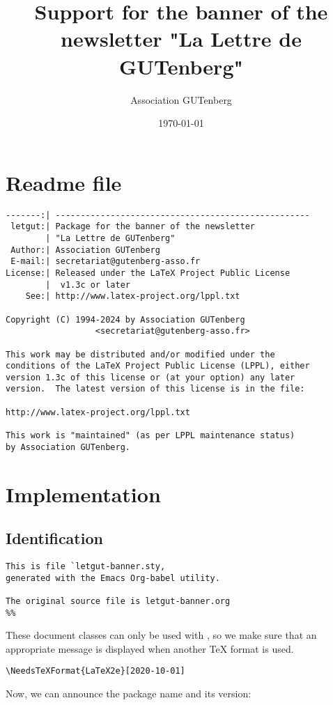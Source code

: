 \documentclass{letgut}
\author{Association GUTenberg}
\date{\today}
\title{Support for the banner of the newsletter "La Lettre de GUTenberg"}
\begin{document}
\section{Readme file}
\label{Readmefile-dlkgxqt0fck0}
\begin{lstlisting}
-------:| ---------------------------------------------------
 letgut:| Package for the banner of the newsletter
        | "La Lettre de GUTenberg"
 Author:| Association GUTenberg
 E-mail:| secretariat@gutenberg-asso.fr
License:| Released under the LaTeX Project Public License
        |  v1.3c or later
    See:| http://www.latex-project.org/lppl.txt

Copyright (C) 1994-2024 by Association GUTenberg
                  <secretariat@gutenberg-asso.fr>

This work may be distributed and/or modified under the
conditions of the LaTeX Project Public License (LPPL), either
version 1.3c of this license or (at your option) any later
version.  The latest version of this license is in the file:

http://www.latex-project.org/lppl.txt

This work is "maintained" (as per LPPL maintenance status)
by Association GUTenberg.
\end{lstlisting}

\section{Implementation}
\label{Implementation-ckogxqt0fck0}
\subsection{Identification}
\label{ImplementationIdentification-gwqgxqt0fck0}
\begin{lstlisting}
This is file `letgut-banner.sty,
generated with the Emacs Org-babel utility.

The original source file is letgut-banner.org
%% 
\end{lstlisting}

These document classes can only be used with \LaTeXe, so we make
sure that an appropriate message is displayed when another \TeX{}
format is used.

\begin{lstlisting}
\NeedsTeXFormat{LaTeX2e}[2020-10-01]
\end{lstlisting}

Now, we can announce the package name and its version:
\end{document}
